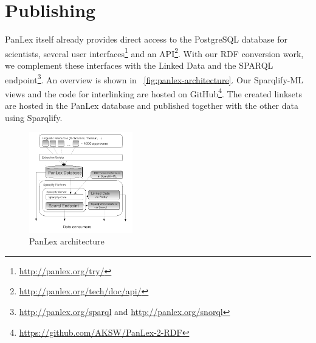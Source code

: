 \documentclass[sw]{iosart2c}
\begin{document}
% 

\section{Publishing}
\label{sec:publishing}
PanLex itself already provides direct access to the PostgreSQL database for scientists,
several user interfaces\footnote{\url{http://panlex.org/try/}} and an
API\footnote{\url{http://panlex.org/tech/doc/api/}}.
With our RDF conversion work, we complement these interfaces with
the Linked Data
and the SPARQL
endpoint\footnote{\url{http://panlex.org/sparql} and \url{http://panlex.org/snorql}}.
An overview is shown in ~\autoref{fig:panlex-architecture}.
Our Sparqlify-ML views and the code for interlinking are
hosted on GitHub\footnote{\url{https://github.com/AKSW/PanLex-2-RDF}}.
The created linksets are hosted in the PanLex database and published together
with the other data using Sparqlify.

\begin{figure}
\centering
\includegraphics[width=0.4\textwidth]{images/PanLex-SW-Architecture-New}
\caption{PanLex architecture}
\label{fig:panlex-architecture}
\end{figure}
\end{document}
